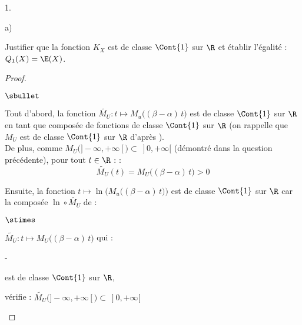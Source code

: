 \documentclass[11pt]{article}%
\begin{document}
\begin{noliste}{1.}
\begin{noliste}{a)}
    
  \item Justifier que la fonction $K_X$ est de classe $\Cont{1}$ sur
    $\R$ et établir l'égalité : $Q_1(X) = \E(X)$.
  \end{noliste}
    \begin{proof}~
      \begin{noliste}{$\sbullet$}
      \item Tout d'abord, la fonction $\widetilde{M_U} :t \mapsto M_u\big((\beta -
        \alpha) \, t\big)$ est de classe $\Cont{1}$ sur $\R$ en tant
        que composée de fonctions de classe $\Cont{1}$ sur $\R$ (on rappelle que
            $M_U$ est de classe $\Cont{1}$ sur $\R$ d'après ).\\
        De plus, comme $M_U(]-\infty, +\infty[)
        \subset \ ]0,+\infty[$ (démontré dans la question précédente),
        pour tout $t \in \R$ :
        :
        \[
          \widetilde{M_U}(t) = M_U\big((\beta-\alpha) \, t\big) >0
        \]
            
          
        
      \item Ensuite, la fonction $t \mapsto \ln \Big( M_u \big((\beta
        - \alpha) \, t\big)\Big)$ est de classe
        $\Cont{1}$ sur $\R$ car la composée $\ln \circ \tilde{M_U}$ de :
        \begin{noliste}{$\stimes$}
        \item $\tilde{M_U} : t \mapsto M_U\big((\beta- \alpha) \, t\big)$ qui :
          \begin{noliste}{-}
          \item est de classe $\Cont{1}$ sur $\R$,
            
          \item vérifie : $\tilde{M_U}(]-\infty, +\infty[) \subset \
            ]0,+\infty[$ 
          \end{noliste}
          

\end{noliste}
\end{noliste}
\end{proof}
\end{noliste}
\end{document}
